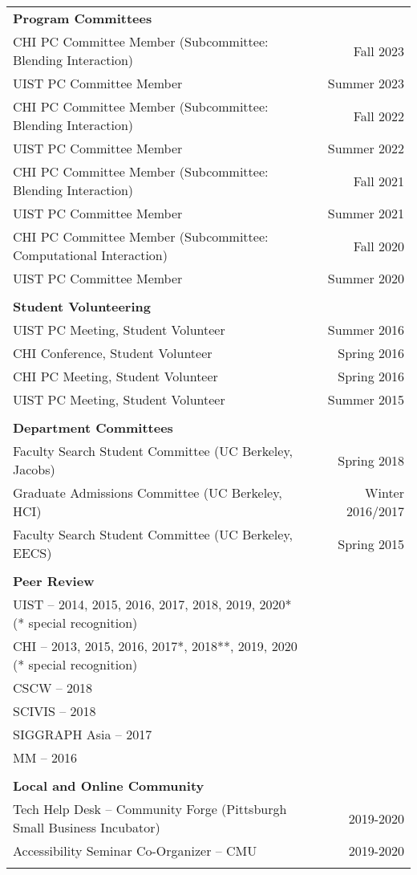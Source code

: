 \begin{longtable}{Xr}
	\textbf{Program Committees} &  \\
	CHI PC Committee Member (Subcommittee: Blending Interaction) & Fall 2023 \\
	UIST PC Committee Member & Summer 2023 \\
	CHI PC Committee Member (Subcommittee: Blending Interaction) & Fall 2022 \\
	UIST PC Committee Member & Summer 2022 \\
	CHI PC Committee Member (Subcommittee: Blending Interaction) & Fall 2021 \\
	UIST PC Committee Member & Summer 2021 \\
	CHI PC Committee Member (Subcommittee: Computational Interaction) & Fall 2020 \\
	UIST PC Committee Member & Summer 2020 \\
	\\

	\textbf{Student Volunteering} &  \\
	UIST PC Meeting, Student Volunteer & Summer 2016 \\
	CHI Conference, Student Volunteer & Spring 2016 \\
	CHI PC Meeting, Student Volunteer & Spring 2016 \\
	UIST PC Meeting, Student Volunteer & Summer 2015 \\
	\\

	\textbf{Department Committees} &  \\
	Faculty Search Student Committee (UC Berkeley, Jacobs) & Spring 2018 \\
	Graduate Admissions Committee (UC Berkeley, HCI) & Winter 2016/2017 \\
	Faculty Search Student Committee (UC Berkeley, EECS) & Spring 2015 \\
	\\

	\textbf{Peer Review} &  \\
	UIST -- 2014, 2015, 2016, 2017, 2018, 2019, 2020* (* special recognition) &  \\
	CHI -- 2013, 2015, 2016, 2017*, 2018**, 2019, 2020 (* special recognition) &  \\
	CSCW -- 2018 &  \\
	SCIVIS -- 2018 &  \\
	SIGGRAPH Asia -- 2017 &  \\
	MM -- 2016 &  \\
	\\

	\textbf{Local and Online Community} &  \\
	Tech Help Desk -- Community Forge (Pittsburgh Small Business Incubator) & 2019-2020 \\
	Accessibility Seminar Co-Organizer -- CMU & 2019-2020 \\
	\\

\end{longtable}